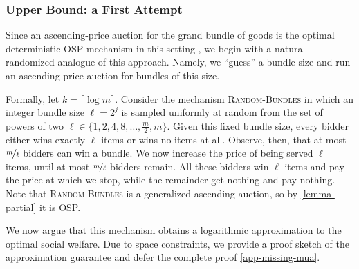 \subsubsection{Upper Bound: a First Attempt}\label{subsub::first-attempt}
Since an ascending-price auction for the grand bundle of goods is the optimal deterministic OSP mechanism in this setting \cite{Ron24}, we begin with a natural randomized analogue of this approach.  Namely, we ``guess'' a bundle size and run an ascending price auction for bundles of this size.  

Formally,
let $k = \lceil \log{m} \rceil$.  Consider the mechanism \textsc{Random-Bundles} in which 
an integer bundle size $\ell =2^{j}$ is sampled uniformly at random from the set of powers of two $\ell \in \{1,2,4,8,\dots,\frac{m}{2}, m\}$. Given this fixed bundle size, every bidder either wins exactly $\ell$ items or wins no items at all.  Observe, then, that at most $\nicefrac{m}{\ell}$ bidders can win a bundle. We now increase the price of being served $\ell$ items, until at most $\nicefrac{m}{\ell}$ bidders remain. All these bidders win $\ell$ items and pay the price at which we stop, while the remainder get nothing and pay nothing.
Note that \textsc{Random-Bundles} is a generalized ascending auction, so by \cref{lemma-partial} it is OSP.


We now argue that this mechanism obtains a logarithmic approximation to the optimal social welfare.  Due to space constraints, we provide a proof sketch of the approximation guarantee and defer the complete proof 
\cref{app-missing-mua}.

